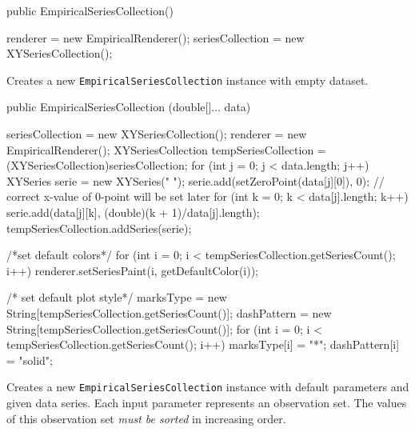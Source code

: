 \begin{code}
   public EmpiricalSeriesCollection() \begin{hide} {
      renderer = new EmpiricalRenderer();
      seriesCollection = new XYSeriesCollection();
   }\end{hide}
\end{code}
\begin{tabb}
   Creates a new \texttt{EmpiricalSeriesCollection} instance with empty dataset.
\end{tabb}
\begin{code}

   public EmpiricalSeriesCollection (double[]... data) \begin{hide} {
      seriesCollection = new XYSeriesCollection();
      renderer = new EmpiricalRenderer();
      XYSeriesCollection tempSeriesCollection = (XYSeriesCollection)seriesCollection;
      for (int j = 0; j < data.length; j++) {
         XYSeries serie = new XYSeries(" ");
         serie.add(setZeroPoint(data[j][0]), 0); // correct x-value of 0-point will be set later
         for (int k = 0; k < data[j].length; k++)
            serie.add(data[j][k], (double)(k + 1)/data[j].length);
         tempSeriesCollection.addSeries(serie);
      }

      /*set default colors*/
      for (int i = 0; i < tempSeriesCollection.getSeriesCount(); i++) {
         renderer.setSeriesPaint(i, getDefaultColor(i));
      }

      /* set default plot style*/
      marksType = new String[tempSeriesCollection.getSeriesCount()];
      dashPattern = new String[tempSeriesCollection.getSeriesCount()];
      for (int i = 0; i < tempSeriesCollection.getSeriesCount(); i++) {
         marksType[i] = "*";
         dashPattern[i] = "solid";
      }
   }\end{hide}
\end{code}
\begin{tabb}
   Creates a new \texttt{EmpiricalSeriesCollection} instance with default
   parameters and given data series. Each input parameter represents an
   observation set. The values of this observation set \emph{must be
   sorted} in increasing order.
\end{tabb}
\begin{htmlonly}
\end{htmlonly}
